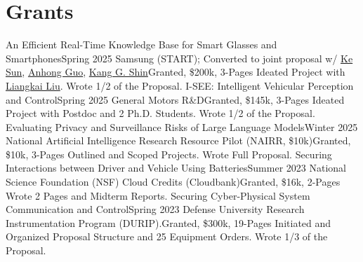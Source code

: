 \section{Grants}
  \CVSubHeadingListStart
    \CVSubheadingLong
      {An Efficient Real-Time Knowledge Base for Smart Glasses and Smartphones}{Spring 2025}
      {Samsung (START); Converted to joint proposal w/ \href{https://samsonsjarkal.github.io/KeSun/}{Ke Sun}, \href{https://guoanhong.com/}{Anhong Guo}, \href{https://web.eecs.umich.edu/~kgshin/}{Kang G. Shin}}{Granted, \$200k, 3-Pages}
      {Ideated Project with \href{https://liangkai.org/}{Liangkai Liu}. Wrote 1/2 of the Proposal.}{}
    \CVSubheadingLong
      {I-SEE: Intelligent Vehicular Perception and Control}{Spring 2025}
      {General Motors R\&D}{Granted, \$145k, 3-Pages}
      {Ideated Project with Postdoc and 2 Ph.D. Students. Wrote 1/2 of the Proposal.}{}
    \CVSubheadingLong
      {Evaluating Privacy and Surveillance Risks of Large Language Models}{Winter 2025}
      {National Artificial Intelligence Research Resource Pilot (NAIRR, \$10k)}{Granted, \$10k, 3-Pages}
      {Outlined and Scoped Projects. Wrote Full Proposal.}{}
    \CVSubheadingLong
      {Securing Interactions between Driver and Vehicle Using Batteries}{Summer 2023}
      {National Science Foundation (NSF) Cloud Credits (Cloudbank)}{Granted, \$16k, 2-Pages}
      {Wrote 2 Pages and Midterm Reports.}{}
    \CVSubheadingLong
      {Securing Cyber-Physical System Communication and Control}{Spring 2023}
      {Defense University Research Instrumentation Program (DURIP).}{Granted, \$300k, 19-Pages}
      {Initiated and Organized Proposal Structure and 25 Equipment Orders. Wrote 1/3 of the Proposal.}{}
  \CVSubHeadingListEnd